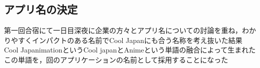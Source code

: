 \subsection{アプリ名の決定}
\par
第一回合宿にて一日目深夜に企業の方々とアプリ名についての討論を重ね，わかりやすくインパクトのある名前でCool Japanにも合う名称を考え抜いた結果Cool JapanimationというCool japanとAnimeという単語の融合によって生まれたこの単語を，回のアプリケーションの名前として採用することになった
